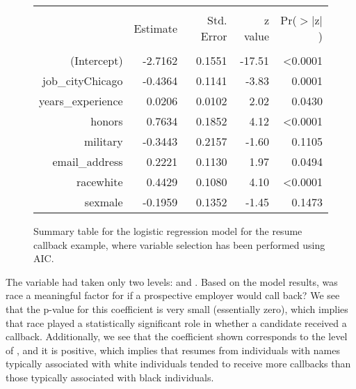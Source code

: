 \begin{figure}[ht]
\centering
\begin{tabular}{rrrrr}
  \hline
  \vspace{-3.7mm} & & & & \\
  & Estimate & Std. Error & z value & Pr($>$$|$z$|$) \\ 
  \hline
  \vspace{-3.8mm} & & & & \\
  (Intercept) & -2.7162 & 0.1551 & -17.51 & <0.0001 \\ 
  job\_cityChicago & -0.4364 & 0.1141 & -3.83 & 0.0001 \\ 
  years\_experience & 0.0206 & 0.0102 & 2.02 & 0.0430 \\ 
  honors & 0.7634 & 0.1852 & 4.12 & <0.0001 \\ 
  military & -0.3443 & 0.2157 & -1.60 & 0.1105 \\ 
  email\_address & 0.2221 & 0.1130 & 1.97 & 0.0494 \\ 
  racewhite & 0.4429 & 0.1080 & 4.10 & <0.0001 \\ 
  sexmale & -0.1959 & 0.1352 & -1.45 & 0.1473 \\ 
\hline
\end{tabular}
\caption{Summary table for the logistic regression model
    for the resume callback example, where variable selection
    has been performed using AIC.}
\label{resumeLogisticReducedModel}
\end{figure}
\newcommand{\resRaceWhiteCoefReduced}{0.4429}

\begin{examplewrap}
\begin{nexample}{The  variable had taken
    only two levels:  and .
    Based on the model results, was race a meaningful
    factor for if a prospective employer would
    call back?}
  We see that the p-value for this coefficient is very
  small (essentially zero), which implies that race
  played a statistically significant role in whether
  a candidate received a callback.
  Additionally, we see that the coefficient shown
  corresponds to the level of ,
  and it is positive,
  which implies that resumes from individuals with
  names typically associated with white individuals
  tended to receive more callbacks than those
  typically associated with black individuals.
\end{nexample}
\end{examplewrap}

